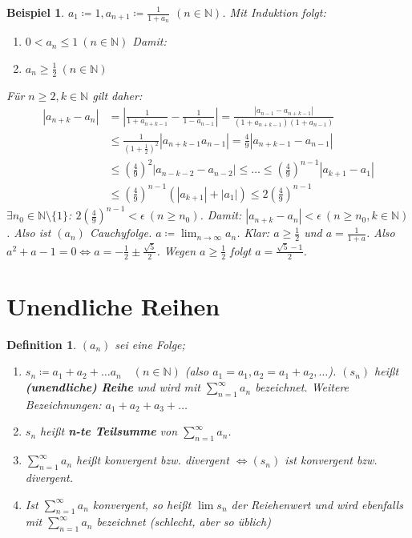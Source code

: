 \documentclass[titlepage,ngerman,a4paper,headsepline,DIV15,halfparskip*,14pt]{scrartcl}
\newcommand{\N}{\mathbb{N}}
\theoremstyle{dotless}
\newtheorem*{definition}{Definition}
\newtheorem*{beispiel*}{Beispiel}
\begin{document}
\begin{beispiel*}
	$a_{1} \coloneqq 1, a_{n+1} \coloneqq \frac{1}{1 + a_{n}}$ $(n \in \N)$. Mit Induktion folgt:
	\begin{enumerate}
		\item[1)] $0 < a_{n} \leq 1 ~(n \in \N)$ Damit:
		\item[2)] $a_{n} \geq \frac{1}{2} ~(n \in \N)$
	\end{enumerate}
	Für $n \geq 2, k \in \N$ gilt daher:
	\begin{align*}
		|a_{n+k} - a_{n} | & = \left| \frac{1}{1+a_{n+k-1}} - \frac{1}{1 - a_{n - 1}} \right| = \frac{|a_{n-1} - a_{n +k-1}|}{(1+a_{n+k-1})(1+a_{n-1})} \\
			& \leq \frac{1}{(1+\frac{1}{2})^{2}} |a_{n+k-1} a_{n-1}| = \frac{4}{9} |a_{n+k-1} - a_{n-1}| \\
			& \leq \left(\frac{4}{9} \right)^{2} |a_{n-k-2} - a_{n-2}| \leq \dotsc \leq \left( \frac{4}{9} \right)^{n-1} |a_{k+1} - a_{1}| \\
			& \leq \left( \frac{4}{9} \right)^{n-1} \left( |a_{k+1}| + |a_{1}|\right) \leq 2 \left( \frac{4}{9} \right)^{n-1} 
	\end{align*}
	$\exists n_{0} \in \N \setminus \{ 1 \}$: $2\left(\frac{4}{9}\right)^{n-1} < \epsilon ~(n \geq n_{0})$. Damit: $|a_{n+k} - a_{n}| < \epsilon ~(n \geq n_{0}, k \in \N)$. Also ist $(a_{n})$ Cauchyfolge. $a \coloneqq \lim_{n \rightarrow \infty} a_{n}$. Klar: $a \geq \frac{1}{2}$ und $a = \frac{1}{1 + a}$. Also $a^{2} + a - 1 = 0 \iff a = - \frac{1}{2} \pm \frac{\sqrt{5}}{2}$. Wegen $a \geq \frac{1}{2}$ folgt $a = \frac{\sqrt{5} - 1}{2}$.
\end{beispiel*}


\newpage


\section{Unendliche Reihen}


    
\begin{definition} $(a_{n})$ sei eine Folge;
	\begin{enumerate}
		\item $ s_{n} \coloneqq a_{1} + a_{2} + \dotsc a_{n} \quad (n \in \N)$
		(also $a_{1} = a_{1}, a_{2} = a_{1} + a_{2}, \dotsc$). $(s_{n})$ hei{\ss}t \textbf{(unendliche) Reihe} und wird mit $\sum_{n = 1}^{\infty} a_{n}$ bezeichnet. Weitere Bezeichnungen: $a_{1} + a_{2} + a_{3} + \dotsc$
		\item $s_{n}$ hei{\ss}t \textbf{n-te Teilsumme} von $\sum_{n=1}^{\infty} a_{n}$.	
		\item $\sum_{n=1}^{\infty} a_{n}$ hei{\ss}t konvergent bzw. divergent $\iff (s_{n})$ ist konvergent 	bzw. divergent.
		\item Ist $\sum_{n = 1}^{\infty} a_{n}$ konvergent, so hei{\ss}t $\lim s_{n}$ der Reiehenwert und wird ebenfalls mit $\sum_{n=1}^{\infty} a_{n}$ bezeichnet (schlecht, aber so üblich)
	\end{enumerate} 	
\end{definition}
\end{document}

